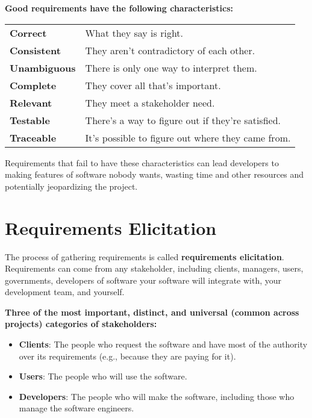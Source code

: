 \noindent\textbf{Good requirements have the following characteristics:}\marginpar{\stakeholderDef}

\spacer
{}
\noindent\begin{tabular}{p{1in} p{3in}}
\rowcolor{gray!25}
\textbf{Correct} & What they say is right.\\
\textbf{Consistent} & They aren't contradictory of each other.\\
\textbf{Unambiguous} & There is only one way to interpret them.\\
\textbf{Complete} & They cover all that's important.\\
\textbf{Relevant} & They meet a stakeholder need.\\
\textbf{Testable} & There's a way to figure out if they're satisfied.\\
\textbf{Traceable} & It's possible to figure out where they came from.\\
\end{tabular}
\spacer

Requirements that fail to have these characteristics can lead developers to making features of software nobody wants, wasting time and other resources and potentially jeopardizing the project.

\section{Requirements Elicitation}

\marginpar{\requirementsElicitationDef}

The process of gathering requirements is called \textbf{requirements elicitation}. Requirements can come from any stakeholder, including clients, managers, users, governments, developers of software your software will integrate with, your development team, and yourself.

\spacer
\noindent\textbf{Three of the most important, distinct, and universal (common across projects) categories of stakeholders:}

\begin{itemize}
\item{\textbf{Clients}: The people who request the software and have most of the authority over its requirements (e.g., because they are paying for it).}
\item{\textbf{Users}: The people who will use the software.}
\item{\textbf{Developers}: The people who will make the software, including those who manage the software engineers.}
\end{itemize}

